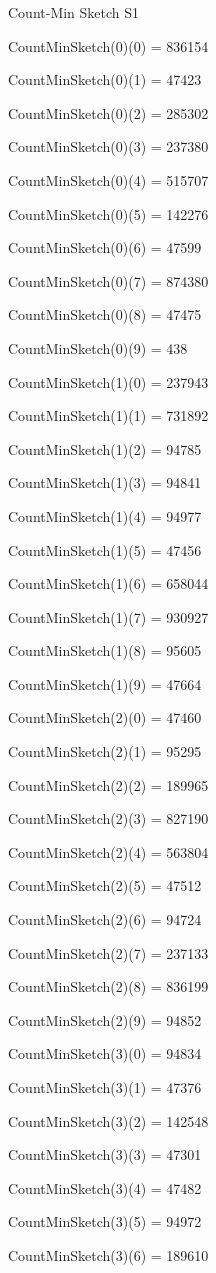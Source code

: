 \documentclass{report}
\begin{document}
 Count-Min Sketch S1

CountMinSketch(0)(0) = 836154

CountMinSketch(0)(1) = 47423

CountMinSketch(0)(2) = 285302

CountMinSketch(0)(3) = 237380

CountMinSketch(0)(4) = 515707

CountMinSketch(0)(5) = 142276

CountMinSketch(0)(6) = 47599

CountMinSketch(0)(7) = 874380

CountMinSketch(0)(8) = 47475

CountMinSketch(0)(9) = 438

CountMinSketch(1)(0) = 237943

CountMinSketch(1)(1) = 731892

CountMinSketch(1)(2) = 94785

CountMinSketch(1)(3) = 94841

CountMinSketch(1)(4) = 94977

CountMinSketch(1)(5) = 47456

CountMinSketch(1)(6) = 658044

CountMinSketch(1)(7) = 930927

CountMinSketch(1)(8) = 95605

CountMinSketch(1)(9) = 47664

CountMinSketch(2)(0) = 47460

CountMinSketch(2)(1) = 95295

CountMinSketch(2)(2) = 189965

CountMinSketch(2)(3) = 827190

CountMinSketch(2)(4) = 563804

CountMinSketch(2)(5) = 47512

CountMinSketch(2)(6) = 94724

CountMinSketch(2)(7) = 237133

CountMinSketch(2)(8) = 836199

CountMinSketch(2)(9) = 94852

CountMinSketch(3)(0) = 94834

CountMinSketch(3)(1) = 47376

CountMinSketch(3)(2) = 142548

CountMinSketch(3)(3) = 47301

CountMinSketch(3)(4) = 47482

CountMinSketch(3)(5) = 94972

CountMinSketch(3)(6) = 189610
\end{document}
